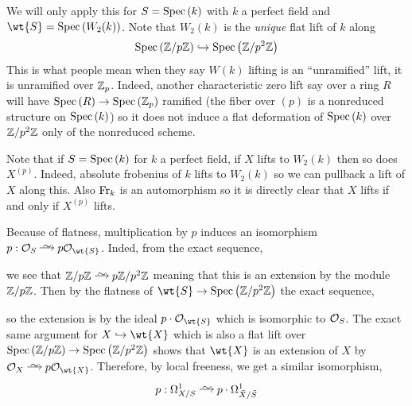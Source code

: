 \documentclass[12pt]{article}
\begin{document}
\begin{rmk}
We will only apply this for $S = \mathrm{Spec}\left( k \right)$ with $k$ a perfect field and $\wt{S} = \Spec{W_2(k)}$. Note that $W_2(k)$ is the \textit{unique} flat lift of $k$ along
\[ \mathrm{Spec}\left( \mathbb{Z}/p\mathbb{Z} \right) \hookrightarrow \mathrm{Spec}\left( \mathbb{Z}/p^2 \mathbb{Z} \right) \]
This is what people mean when they say $W(k)$ lifting is an ``unramified'' lift, it is unramified over $\mathbb{Z}_p$. Indeed, another characteristic zero lift say over a ring $R$ will have $\mathrm{Spec}\left( R \right) \to \mathrm{Spec}\left( \mathbb{Z}_p \right)$ ramified (the fiber over $(p)$ is a nonreduced structure on $\mathrm{Spec}\left( k \right)$) so it does not induce a flat deformation of $\mathrm{Spec}\left( k \right)$ over $\mathbb{Z}/p^2 \mathbb{Z}$ only of the nonreduced scheme.
\end{rmk}

\begin{rmk}
Note that if $S = \mathrm{Spec}\left( k \right)$ for $k$ a perfect field, if $X$ lifts to $W_2(k)$ then so does $X^{(p)}$. Indeed, absolute frobenius of $k$ lifts to $W_2(k)$ so we can pullback a lift of $X$ along this. Also $\mathrm{Fr}_k$ is an automorphism so it is directly clear that $X$ lifts if and only if $X^{(p)}$ lifts.
\end{rmk}

\begin{rmk}
Because of flatness, multiplication by $p$ induces an isomorphism $p : \struct{S} \iso p \struct{\wt{S}}$. 
Inded, from the exact sequence,
\begin{center}
\end{center}
we see that $\Z/p\Z \iso p \Z/p^2\Z$ meaning that this is an extension  by the module $\mathbb{Z}/p\mathbb{Z}$. Then by the flatness of $\wt{S} \to \Spec{\Z/p^2\Z}$ the exact sequence,
\begin{center}
\end{center}
so the extension is by the ideal $p \cdot \struct{\wt{S}}$ which is isomorphic to $\mathcal{O}_{S}$. The exact same argument for $X \embed \wt{X}$ which is also a flat lift over $\mathrm{Spec}\left( \mathbb{Z}/p\mathbb{Z} \right) \to \mathrm{Spec}\left( \mathbb{Z}/p^2\mathbb{Z} \right)$ shows that $\wt{X}$ is an extension of $X$ by $\struct{X} \iso p \struct{\wt{X}}$. Therefore, by local freeness, we get a similar isomorphism,
\[ p : \Omega^1_{X/S} \iso p \cdot \Omega^1_{\tilde{X}/\tilde{S}} \]
\end{rmk}
\end{document}
